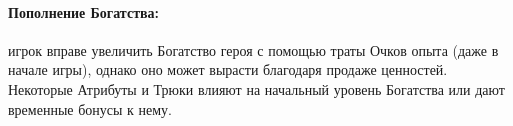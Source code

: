 \paragraph{Пополнение Богатства:} игрок вправе увеличить Богатство героя с помощью траты Очков опыта (даже в начале игры), однако оно может вырасти благодаря продаже ценностей. Некоторые Атрибуты и Трюки влияют на начальный уровень Богатства или дают временные бонусы к нему.
